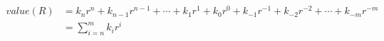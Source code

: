 \begin{align*}
    value(R) & =k_nr^n+k_{n-1}r^{n-1}+\cdots+k_1r^1+k_0r^0+k_{-1}r^{-1}+k_{-2}r^{-2}+\cdots+k_{-m}r^{-m} \\
             & =\sum_{i=n}^{m}k_ir^i
\end{align*}